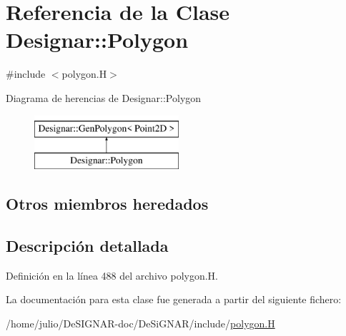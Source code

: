 \hypertarget{class_designar_1_1_polygon}{}\section{Referencia de la Clase Designar\+:\+:Polygon}
\label{class_designar_1_1_polygon}


{\ttfamily \#include $<$polygon.\+H$>$}

Diagrama de herencias de Designar\+:\+:Polygon\begin{figure}[H]
\begin{center}
\leavevmode
\includegraphics[height=2.000000cm]{class_designar_1_1_polygon}
\end{center}
\end{figure}
\subsection*{Otros miembros heredados}


\subsection{Descripción detallada}


Definición en la línea 488 del archivo polygon.\+H.



La documentación para esta clase fue generada a partir del siguiente fichero\+:\begin{DoxyCompactItemize}
\item 
/home/julio/\+De\+S\+I\+G\+N\+A\+R-\/doc/\+De\+Si\+G\+N\+A\+R/include/\hyperlink{polygon_8_h}{polygon.\+H}\end{DoxyCompactItemize}

